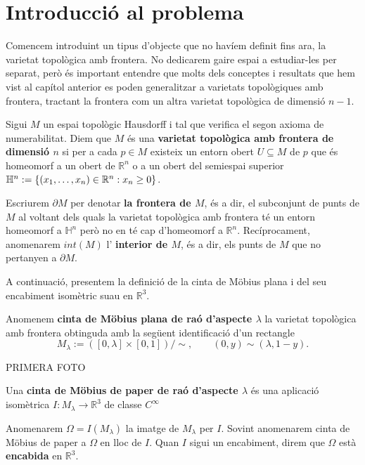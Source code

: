 \section{Introducció al problema}
Comencem introduint un tipus d'objecte que no havíem definit fins ara, la varietat topològica amb frontera. No dedicarem gaire espai a estudiar-les per separat, però és important entendre que molts dels conceptes i resultats que hem vist al capítol anterior es poden generalitzar a varietats topològiques amb frontera, tractant la frontera com un altra varietat topològica de dimensió $n-1$.
\begin{defi}\label{def:varietat_topologica_amb_frontera}
    Sigui $M$ un espai topològic Hausdorff i tal que verifica el segon axioma de numerabilitat. Diem que $M$ és una \textbf{varietat topològica amb frontera de dimensió $n$} si per a cada $p\in M$ existeix un entorn obert $U\subseteq M$ de $p$ que és homeomorf a un obert de $\mathbb R^n$ o a un obert del semiespai superior $\mathbb H^n := \{(x_1, \dots, x_n)\in\mathbb R^n:x_n\geq 0\}$. 
\end{defi}

\begin{nota}\label{nota:frontier_and_interior}
    Escriurem $\partial M$ per denotar \textbf{la frontera de $M$}, és a dir, el subconjunt de punts de $M$ al voltant dels quals la varietat topològica amb frontera té un entorn homeomorf a $\mathbb H^n$ però no en té cap d'homeomorf a $\mathbb R^n$. Recíprocament, anomenarem $int(M)$ l' \textbf{interior de $M$}, és a dir, els punts de $M$ que no pertanyen a $\partial M$.
\end{nota}

A continuació, presentem la definició de la cinta de Möbius plana i del seu encabiment isomètric suau en $\mathbb R^3$.
\begin{defi}
    Anomenem \textbf{cinta de Möbius plana de raó d'aspecte $\lambda$} la varietat topològica amb frontera obtinguda amb la següent identificació d'un rectangle
    $$M_\lambda := ([0,\lambda] \times [0,1])/\sim, \quad\quad (0,y)\sim(\lambda,1-y).$$
\end{defi}
{\color{blue} PRIMERA FOTO}

\begin{defi}\label{def:cinta_mobius_paper}
    Una \textbf{cinta de Möbius de paper de raó d'aspecte $\lambda$} és una aplicació isomètrica $I:M_{\lambda}\to\mathbb R^3$ de classe $C^\infty$
\end{defi}
\begin{nota}
    Anomenarem $\Omega=I(M_\lambda)$ la imatge de $M_\lambda$ per $I$. Sovint anomenarem cinta de Möbius de paper a $\Omega$ en lloc de $I$. Quan $I$ sigui un encabiment, direm que $\Omega$ està \textbf{encabida} en $\mathbb R^3$.
\end{nota}

